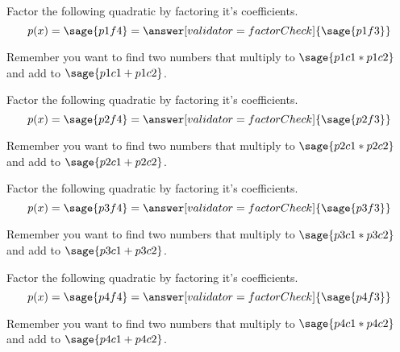 \documentclass{ximera}
\begin{document}
\begin{problem}
    Factor the following quadratic by factoring it's coefficients. 
    \[
        p(x) = \sage{p1f4} = \answer[validator=factorCheck]{\sage{p1f3}}
    \]
    \begin{feedback}
        Remember you want to find two numbers that multiply to $\sage{p1c1*p1c2}$ and add to $\sage{p1c1+p1c2}$.
    \end{feedback}
\end{problem}



\begin{problem}
    Factor the following quadratic by factoring it's coefficients.
    \[
        p(x) = \sage{p2f4} = \answer[validator=factorCheck]{\sage{p2f3}}
    \]
    \begin{feedback}
        Remember you want to find two numbers that multiply to $\sage{p2c1*p2c2}$ and add to $\sage{p2c1+p2c2}$.
    \end{feedback}
\end{problem}



\begin{problem}
    Factor the following quadratic by factoring it's coefficients.
    \[
        p(x) = \sage{p3f4} = \answer[validator=factorCheck]{\sage{p3f3}}
    \]
    \begin{feedback}
        Remember you want to find two numbers that multiply to $\sage{p3c1*p3c2}$ and add to $\sage{p3c1+p3c2}$.
    \end{feedback}
\end{problem}



\begin{problem}
    Factor the following quadratic by factoring it's coefficients.
    \[
        p(x) = \sage{p4f4} = \answer[validator=factorCheck]{\sage{p4f3}}
    \]
    \begin{feedback}
        Remember you want to find two numbers that multiply to $\sage{p4c1*p4c2}$ and add to $\sage{p4c1+p4c2}$.
    \end{feedback}
\end{problem}
\end{document}
